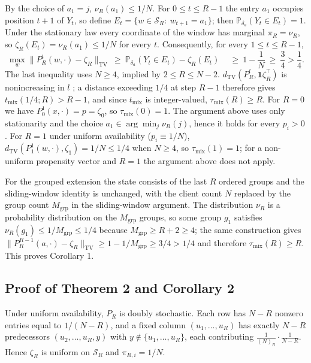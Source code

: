 \documentclass[twoside,11pt]{article}
\begin{document}
By the choice of $a_1=j$, $\nu_R(a_1)\leq1/N$. For $0\leq t\leq R-1$ the entry $a_1$ occupies position $t+1$ of $Y_t$, so define $E_t=\{w\in\mathcal{S}_R:\ w_{t+1}=a_1\}$; then $\mathbb{P}_{\delta_a}(Y_t\in E_t)=1$. Under the stationary law every coordinate of the window has marginal $\pi_R=\nu_R$, so $\zeta_R(E_t)=\nu_R(a_1)\leq1/N$ for every $t$. Consequently, for every $1\leq t\leq R-1$,
\begin{equation}\label{eq:e33}
\max_w\big\|P_R^{t}(w,\cdot)-\zeta_R\big\|_{\mathrm{TV}} \ \geq\ \mathbb{P}_{\delta_a}(Y_t\in E_t)-\zeta_R(E_t)\quad \ \geq\ 1-\frac1N\ \geq\ \frac34>\frac14.
\end{equation}
The last inequality uses $N\geq4$, implied by $2\leq R\leq N-2$. $d_{\mathrm{TV}}(P_R^{l},\mathbf{1}\zeta_R^{\top})$ is nonincreasing in $l$ \citep[Lemma~5(1)]{ref1}; a distance exceeding $1/4$ at step $R-1$ therefore gives $t_{\mathrm{mix}}(1/4;R)>R-1$, and since $t_{\mathrm{mix}}$ is integer-valued, $\tau_{\mathrm{mix}}(R)\geq R$. For $R=0$ we have $P_0^{1}(x,\cdot)=p=\zeta_0$, so $\tau_{\mathrm{mix}}(0)=1$. The argument above uses only stationarity and the choice $a_1\in\arg\min_j\nu_R(j)$, hence it holds for every $p_i>0$. For $R=1$ under uniform availability ($p_i\equiv1/N$), $d_{\mathrm{TV}}(P_1^{1}(w,\cdot),\zeta_1)=1/N\leq1/4$ when $N\geq4$, so $\tau_{\mathrm{mix}}(1)=1$; for a non-uniform propensity vector and $R=1$ the argument above does not apply.

For the grouped extension the state consists of the last $R$ ordered groups and the sliding-window identity is unchanged, with the client count $N$ replaced by the group count $M_{\mathrm{grp}}$ in the sliding-window argument. The distribution $\nu_R$ is a probability distribution on the $M_{\mathrm{grp}}$ groups, so some group $g_1$ satisfies $\nu_R(g_1)\leq1/M_{\mathrm{grp}}\leq1/4$ because $M_{\mathrm{grp}}\geq R+2\geq4$; the same construction gives $\|P_R^{R-1}(a,\cdot)-\zeta_R\|_{\mathrm{TV}}\geq1-1/M_{\mathrm{grp}}\geq3/4>1/4$ and therefore $\tau_{\mathrm{mix}}(R)\geq R$. This proves Corollary 1.

\subsection{Proof of Theorem 2 and Corollary 2}
Under uniform availability, $P_R$ is doubly stochastic. Each row has $N-R$ nonzero entries equal to $1/(N-R)$, and a fixed column $(u_1,\dots,u_R)$ has exactly $N-R$ predecessors $(u_2,\dots,u_R,y)$ with $y\notin\{u_1,\dots,u_R\}$, each contributing $\frac{1}{(N)_R}\cdot\frac{1}{N-R}$. Hence $\zeta_R$ is uniform on $\mathcal{S}_R$ and $\pi_{R,i}=1/N$.
\end{document}
